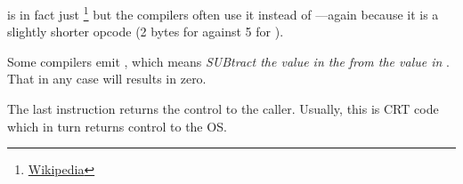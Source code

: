 
\XOR is in fact just \footnote{\href{http://go.yurichev.com/17118}{Wikipedia}} but the compilers often use it instead of
---again because it is a slightly shorter opcode (2 bytes for \XOR against 5 for \MOV).

Some compilers emit , which means \emph{SUBtract the value in the} \EAX \emph{from the value in} \EAX. That in any case will results in zero.

The last instruction \RET returns the control to the \gls{caller}. Usually, this is \CCpp \ac{CRT} code which in turn returns control to the \ac{OS}.
